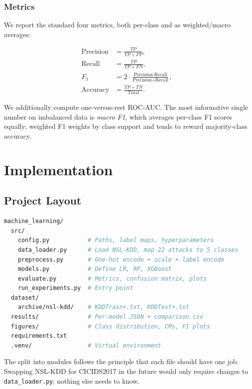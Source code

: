 \documentclass[11pt, a4paper]{article}
\begin{document}
\subsubsection{Metrics}
We report the standard four metrics, both per-class and as weighted/macro averages:

\begin{align*}
\text{Precision} &= \frac{TP}{TP + FP}, \\
\text{Recall}    &= \frac{TP}{TP + FN}, \\
F_1              &= 2 \cdot \frac{\text{Precision} \cdot \text{Recall}}{\text{Precision} + \text{Recall}}, \\
\text{Accuracy}  &= \frac{TP + TN}{\text{Total}}.
\end{align*}

We additionally compute one-versus-rest ROC-AUC. The most informative single number on imbalanced data is \emph{macro F1}, which averages per-class F1 scores equally; weighted F1 weights by class support and tends to reward majority-class accuracy.

\section{Implementation}
\label{sec:implementation}

\subsection{Project Layout}
\begin{lstlisting}[language=bash, basicstyle=\ttfamily\small, numbers=none]
machine_learning/
  src/
    config.py           # Paths, label maps, hyperparameters
    data_loader.py      # Load NSL-KDD, map 22 attacks to 5 classes
    preprocess.py       # One-hot encode + scale + label encode
    models.py           # Define LR, RF, XGBoost
    evaluate.py         # Metrics, confusion matrix, plots
    run_experiments.py  # Entry point
  dataset/
    archive/nsl-kdd/    # KDDTrain+.txt, KDDTest+.txt
  results/              # Per-model JSON + comparison.csv
  figures/              # Class distribution, CMs, FI plots
  requirements.txt
  .venv/                # Virtual environment
\end{lstlisting}

The split into modules follows the principle that each file should have one job. Swapping NSL-KDD for CICIDS2017 in the future would only require changes to \texttt{data\_loader.py}; nothing else needs to know.
\end{document}
